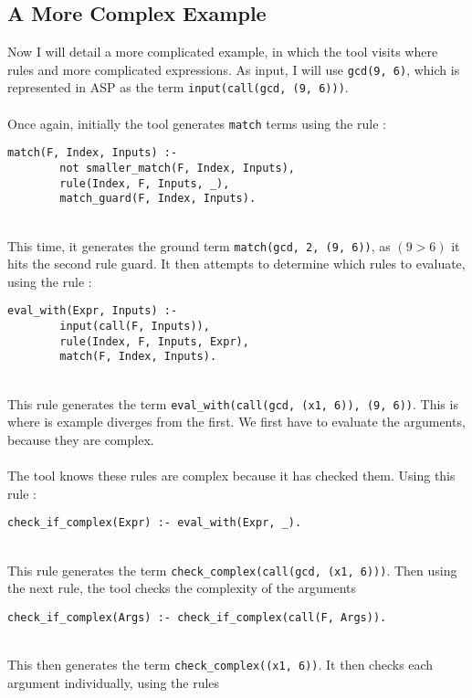 \subsection{A More Complex Example}
Now I will detail a more complicated example, in which the tool visits where rules and more complicated expressions. As input, I will use \lstinline{gcd(9, 6)}, which is represented in ASP as the term \lstinline{input(call(gcd, (9, 6)))}. \\ \\
Once again, initially the tool generates \lstinline{match} terms using the rule : %

\begin{lstlisting}[firstnumber=197]
match(F, Index, Inputs) :-
		not smaller_match(F, Index, Inputs), 
		rule(Index, F, Inputs, _), 
		match_guard(F, Index, Inputs).
\end{lstlisting}
\mbox{} \\
This time, it generates the ground term \lstinline{match(gcd, 2, (9, 6))}, as $(9 > 6)$ it hits the second rule guard. It then attempts to determine which rules to evaluate, using the rule : \\ %

\begin{lstlisting}[firstnumber=128]
eval_with(Expr, Inputs) :- 
		input(call(F, Inputs)), 
		rule(Index, F, Inputs, Expr), 
		match(F, Index, Inputs).
\end{lstlisting}
\mbox{} \\
This rule generates the term \lstinline!eval_with(call(gcd, (x1, 6)), (9, 6))!. This is where is example diverges from the first. We first have to evaluate the arguments, because they are complex. \\ \\
The tool knows these rules are complex because it has checked them. Using this rule : \\

\begin{lstlisting}[firstnumber=149]
check_if_complex(Expr) :- eval_with(Expr, _).
\end{lstlisting}
\mbox{} \\
This rule generates the term \lstinline!check_complex(call(gcd, (x1, 6)))!. Then using the next rule, the tool checks the complexity of the arguments \\

\begin{lstlisting}[firstnumber=151]
check_if_complex(Args) :- check_if_complex(call(F, Args)).
\end{lstlisting}
\mbox{} \\
This then generates the term \lstinline!check_complex((x1, 6))!. It then checks each argument individually, using the rules  \\

